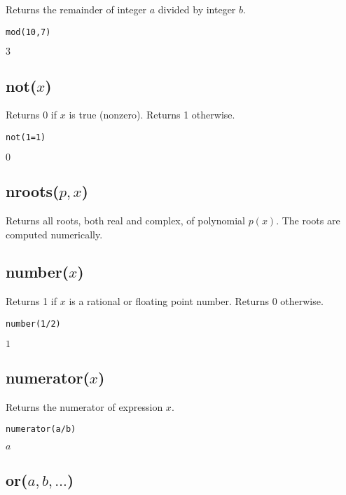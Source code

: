 Returns the remainder of integer $a$ divided by integer $b$.

{\color{blue}
\begin{verbatim}
mod(10,7)
\end{verbatim}
}

\noindent
$3$

\subsection*{not($x$)}

Returns 0 if $x$ is true (nonzero).
Returns 1 otherwise.

{\color{blue}
\begin{verbatim}
not(1=1)
\end{verbatim}
}

\noindent
$0$

\subsection*{nroots($p,x$)}

Returns all roots, both real and complex,
of polynomial $p(x)$.
The roots are computed numerically.

\subsection*{number($x$)}

Returns 1 if $x$ is a rational or floating point number.
Returns 0 otherwise.

{\color{blue}
\begin{verbatim}
number(1/2)
\end{verbatim}
}

\noindent
$1$

\subsection*{numerator($x$)}

Returns the numerator of expression $x$.

{\color{blue}
\begin{verbatim}
numerator(a/b)
\end{verbatim}
}

\noindent
$a$

\subsection*{or($a,b,\ldots$)}

